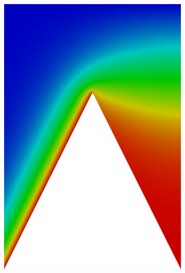 \documentclass[letterpaper]{article}
\begin{document}
\begin{figure}[p]
\begin{subfigure}[t]{0.4\textwidth}
\includegraphics[width=\textwidth]{figs/Wedge/modified16c.png}

\end{subfigure}
\end{figure}
\end{document}
